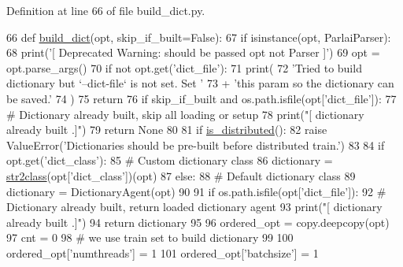 Definition at line 66 of file build\+\_\+dict.\+py.


\begin{DoxyCode}
66 \textcolor{keyword}{def }\hyperlink{namespaceprojects_1_1convai2_1_1build__dict_a0e5fa5d8d2bd2bc934e287a49d2d60c7}{build\_dict}(opt, skip\_if\_built=False):
67     \textcolor{keywordflow}{if} isinstance(opt, ParlaiParser):
68         print(\textcolor{stringliteral}{'[ Deprecated Warning: should be passed opt not Parser ]'})
69         opt = opt.parse\_args()
70     \textcolor{keywordflow}{if} \textcolor{keywordflow}{not} opt.get(\textcolor{stringliteral}{'dict\_file'}):
71         print(
72             \textcolor{stringliteral}{'Tried to build dictionary but `--dict-file` is not set. Set '}
73             + \textcolor{stringliteral}{'this param so the dictionary can be saved.'}
74         )
75         \textcolor{keywordflow}{return}
76     \textcolor{keywordflow}{if} skip\_if\_built \textcolor{keywordflow}{and} os.path.isfile(opt[\textcolor{stringliteral}{'dict\_file'}]):
77         \textcolor{comment}{# Dictionary already built, skip all loading or setup}
78         print(\textcolor{stringliteral}{"[ dictionary already built .]"})
79         \textcolor{keywordflow}{return} \textcolor{keywordtype}{None}
80 
81     \textcolor{keywordflow}{if} \hyperlink{namespaceparlai_1_1utils_1_1distributed_a023acb5e3b66e1f27e21247c35661279}{is\_distributed}():
82         \textcolor{keywordflow}{raise} ValueError(\textcolor{stringliteral}{'Dictionaries should be pre-built before distributed train.'})
83 
84     \textcolor{keywordflow}{if} opt.get(\textcolor{stringliteral}{'dict\_class'}):
85         \textcolor{comment}{# Custom dictionary class}
86         dictionary = \hyperlink{namespaceparlai_1_1core_1_1params_aa6083a72ad328d26016bd5f805a0b1c8}{str2class}(opt[\textcolor{stringliteral}{'dict\_class'}])(opt)
87     \textcolor{keywordflow}{else}:
88         \textcolor{comment}{# Default dictionary class}
89         dictionary = DictionaryAgent(opt)
90 
91     \textcolor{keywordflow}{if} os.path.isfile(opt[\textcolor{stringliteral}{'dict\_file'}]):
92         \textcolor{comment}{# Dictionary already built, return loaded dictionary agent}
93         print(\textcolor{stringliteral}{"[ dictionary already built .]"})
94         \textcolor{keywordflow}{return} dictionary
95 
96     ordered\_opt = copy.deepcopy(opt)
97     cnt = 0
98     \textcolor{comment}{# we use train set to build dictionary}
99 
100     ordered\_opt[\textcolor{stringliteral}{'numthreads'}] = 1
101     ordered\_opt[\textcolor{stringliteral}{'batchsize'}] = 1

\end{DoxyCode}
